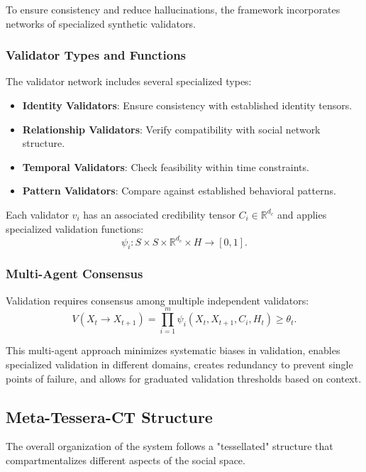 \documentclass[11pt,a4paper]{article}
\begin{document}
To ensure consistency and reduce hallucinations, the framework incorporates networks of specialized synthetic validators.

\subsubsection{Validator Types and Functions}

The validator network includes several specialized types:
\begin{itemize}
\item \textbf{Identity Validators}: Ensure consistency with established identity tensors.
\item \textbf{Relationship Validators}: Verify compatibility with social network structure.
\item \textbf{Temporal Validators}: Check feasibility within time constraints.
\item \textbf{Pattern Validators}: Compare against established behavioral patterns.
\end{itemize}

Each validator $v_i$ has an associated credibility tensor $C_i \in \mathbb{R}^{d_c}$ and applies specialized validation functions:
\begin{equation}
\psi_i : S \times S \times \mathbb{R}^{d_c} \times H \to [0, 1].
\end{equation}

\subsubsection{Multi-Agent Consensus}

Validation requires consensus among multiple independent validators:
\begin{equation}
V(X_t \to X_{t+1}) = \prod_{i=1}^m \psi_i(X_t, X_{t+1}, C_i, H_t) \geq \theta_t.
\end{equation}

This multi-agent approach minimizes systematic biases in validation, enables specialized validation in different domains, creates redundancy to prevent single points of failure, and allows for graduated validation thresholds based on context.

\subsection{Meta-Tessera-CT Structure}

The overall organization of the system follows a "tessellated" structure that compartmentalizes different aspects of the social space.
\end{document}
